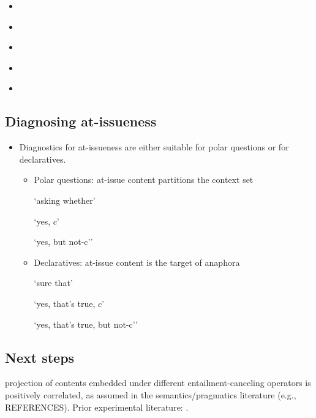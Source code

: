 \documentclass[11pt,fleqn]{article}
\newcommand{\6}{\mbox{$[\hspace*{-.6mm}[$}}
\newcommand{\9}{\mbox{$]\hspace*{-.6mm}]$}}
\begin{document}
\begin{itemize}
\begin{itemize}
\end{itemize}

\item \citealt{syrett-koev2015}

\item \citealt{tonhauser-sula6}

\item \citealt{brst-salt10}

\item \citealt{tbd-variability}

\item \citealt{brst-ar}

\end{itemize}

\subsection{Diagnosing at-issueness}

\begin{itemize}

\item Diagnostics for at-issueness are either suitable for polar questions or for declaratives.

\begin{itemize}

\item Polar questions: at-issue content partitions the context set

`asking whether'

`yes, $c$'

`yes, but not-c''

\item Declaratives: at-issue content is the target of anaphora

`sure that'

`yes, that's true, $c$'

`yes, that's true, but not-c''

\end{itemize}

\end{itemize}

\subsection{Next steps}

projection of contents embedded under different entailment-canceling operators is positively correlated, as assumed in the semantics/pragmatics literature (e.g., REFERENCES). Prior experimental literature: \citealt{smith-hall11,smith-hall-cls,demarneffe-etal-sub23}. 
\end{document}
